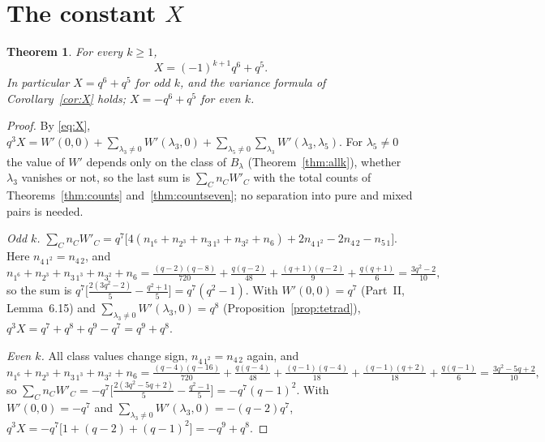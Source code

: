 \documentclass[12pt,a4paper]{amsart}
\newtheorem{theorem}{Theorem}[section]
\theoremstyle{definition}
\begin{document}
\section{The constant \texorpdfstring{$X$}{X}}\label{sec:X}
\begin{theorem}\label{thm:Xstatus}
For every $k\ge1$,
\[
X=(-1)^{k+1}q^6+q^5 .
\]
In particular $X=q^6+q^5$ for odd $k$, and the variance formula of Corollary~\ref{cor:X} holds; $X=-q^6+q^5$ for even $k$.
\end{theorem}
\begin{proof}
By \eqref{eq:X}, $q^3X=W'(0,0)+\sum_{\lambda_3\ne0}W'(\lambda_3,0)+\sum_{\lambda_5\ne0}\sum_{\lambda_3}W'(\lambda_3,\lambda_5)$. For $\lambda_5\ne0$ the value of $W'$ depends only on the class of $B_\lambda$ (Theorem~\ref{thm:allk}), whether $\lambda_3$ vanishes or not, so the last sum is $\sum_Cn_CW'_C$ with the total counts of Theorems~\ref{thm:counts} and~\ref{thm:countseven}; no separation into pure and mixed pairs is needed.

\emph{Odd $k$.} $\sum_Cn_CW'_C=q^7\bigl[4(n_{1^6}+n_{2^3}+n_{3\,1^3}+n_{3^2}+n_6)+2n_{4\,1^2}-2n_{4\,2}-n_{5\,1}\bigr]$. Here $n_{4\,1^2}=n_{4\,2}$, and
\[
n_{1^6}+n_{2^3}+n_{3\,1^3}+n_{3^2}+n_6=\tfrac{(q-2)(q-8)}{720}+\tfrac{q(q-2)}{48}+\tfrac{(q+1)(q-2)}9+\tfrac{q(q+1)}6=\tfrac{3q^2-2}{10},
\]
so the sum is $q^7\bigl[\frac{2(3q^2-2)}5-\frac{q^2+1}5\bigr]=q^7(q^2-1)$. With $W'(0,0)=q^7$ (Part~II, Lemma~6.15) and $\sum_{\lambda_3\ne0}W'(\lambda_3,0)=q^8$ (Proposition~\ref{prop:tetrad}), $q^3X=q^7+q^8+q^9-q^7=q^9+q^8$.

\emph{Even $k$.} All class values change sign, $n_{4\,1^2}=n_{4\,2}$ again, and
\[
n_{1^6}+n_{2^3}+n_{3\,1^3}+n_{3^2}+n_6=\tfrac{(q-4)(q-16)}{720}+\tfrac{q(q-4)}{48}+\tfrac{(q-1)(q-4)}{18}+\tfrac{(q-1)(q+2)}{18}+\tfrac{q(q-1)}6=\tfrac{3q^2-5q+2}{10},
\]
so $\sum_Cn_CW'_C=-q^7\bigl[\frac{2(3q^2-5q+2)}5-\frac{q^2-1}5\bigr]=-q^7(q-1)^2$. With $W'(0,0)=-q^7$ and $\sum_{\lambda_3\ne0}W'(\lambda_3,0)=-(q-2)q^7$, $q^3X=-q^7\bigl[1+(q-2)+(q-1)^2\bigr]=-q^9+q^8$.
\end{proof}
\end{document}

